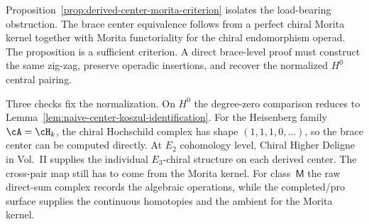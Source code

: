\begin{remark}
\label{rem:derived-center-koszul-scope}
Proposition~\ref{prop:derived-center-morita-criterion} isolates the
load-bearing obstruction. The brace center equivalence follows from a
perfect chiral Morita kernel together with Morita functoriality for
the chiral endomorphism operad. The proposition is a sufficient
criterion. A direct brace-level proof must construct the same
zig-zag, preserve operadic insertions, and recover the normalized
$H^0$ central pairing.

Three checks fix the normalization. On $H^0$ the degree-zero
comparison reduces to
Lemma~\ref{lem:naive-center-koszul-identification}. For the Heisenberg
family $\cA=\cH_k$, the chiral Hochschild complex has shape
$(1,1,1,0,\ldots)$, so the brace center can be computed directly. At
$E_2$ cohomology level, Chiral Higher Deligne in Vol.~II supplies the
individual $E_3$-chiral structure on each derived center. The
cross-pair map still has to come from the Morita kernel. For
class~$\mathsf M$ the raw direct-sum complex records the algebraic
operations, while the completed/pro surface supplies the continuous
homotopies and the ambient for the Morita kernel.
\end{remark}

